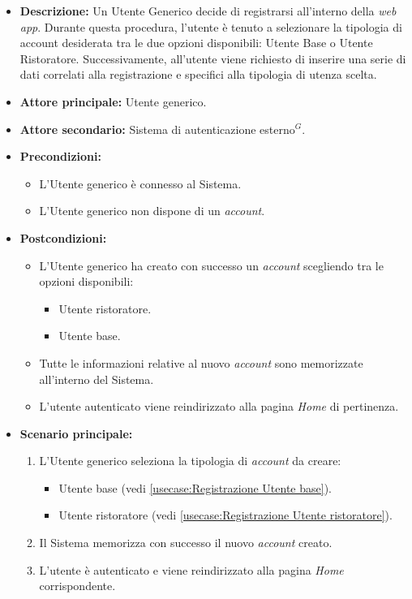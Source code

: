 \label{usecase:Effettua registrazione}

\begin{itemize}
	\item \textbf{Descrizione:} Un Utente Generico decide di registrarsi all'interno della \textit{web app}. 
    Durante questa procedura, l'utente è tenuto a selezionare la tipologia di account desiderata tra le due opzioni disponibili: Utente Base o Utente Ristoratore. 
    Successivamente, all'utente viene richiesto di inserire una serie di dati correlati alla registrazione e specifici alla tipologia di utenza scelta.

	\item \textbf{Attore principale:} Utente generico.
	\item \textbf{Attore secondario:} Sistema di autenticazione esterno$^G$.
	\item \textbf{Precondizioni:}
        \begin{itemize}
            \item L'Utente generico è connesso al Sistema.
            \item L'Utente generico non dispone di un \textit{account}.
        \end{itemize}
	\item \textbf{Postcondizioni:}
        \begin{itemize} 
            \item L'Utente generico ha creato con successo un \textit{account} scegliendo tra le opzioni disponibili:
            \begin{itemize}
                \item Utente ristoratore.
                \item Utente base.
            \end{itemize}
            \item Tutte le informazioni relative al nuovo \textit{account} sono memorizzate all'interno del Sistema.
            \item L'utente autenticato viene reindirizzato alla pagina \textit{Home} di pertinenza.
        \end{itemize}


	\item \textbf{Scenario principale:}
	      \begin{enumerate}
		      \item L'Utente generico seleziona la tipologia di \textit{account} da creare: 
		      \begin{itemize}
				\item Utente base (vedi \autoref{usecase:Registrazione Utente base}).
				\item Utente ristoratore (vedi \autoref{usecase:Registrazione Utente ristoratore}).
			  \end{itemize} 
              \item Il Sistema memorizza con successo il nuovo \textit{account} creato.
		      \item L'utente è autenticato e viene reindirizzato alla pagina \textit{Home} corrispondente.
	      \end{enumerate}
		

\end{itemize}
